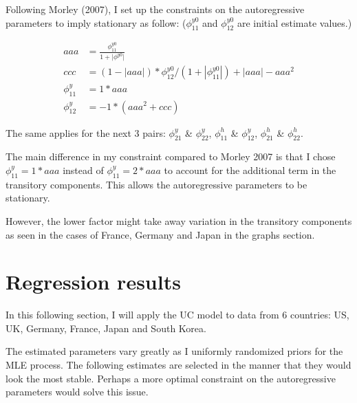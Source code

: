 \documentclass[fleqn]{article}
\begin{document}
\begin{outline}[enumerate]
\pagebreak

Following Morley (2007), I set up the constraints on the autoregressive parameters to imply stationary as follow: ($\phi^{y0}_{11}$ and $\phi^{y0}_{12}$ are initial estimate values.)

\begin{align*}
aaa &= \frac{\phi^{y0}_{11}}{1+|{\phi^{y0}|}}
\\
ccc &=(1 - |aaa|)*\phi^{y0}_{12}/(1 + |\phi^{y0}_{11}|) + |aaa| - aaa^2
\\
\phi^{y}_{11} &= 1*aaa
\\
\phi^{y}_{12} &= -1* (aaa^2 + ccc)
\end{align*}

The same applies for the next 3 pairs: $\phi^{y}_{21}$ \& $\phi^{y}_{22}$, $\phi^{h}_{11}$ \& $\phi^{y}_{12}$, $\phi^{h}_{21}$ \& $\phi^{h}_{22}$.
\vspace{5mm} %

The main difference in my constraint compared to Morley 2007 is that I chose $\phi^{y}_{11} = 1*aaa$ instead of  $\phi^{y}_{11} = 2*aaa$ to account for the additional term in the transitory components. This allows the autoregressive parameters to be stationary. 

However, the lower factor might take away variation in the transitory components as seen in the cases of France, Germany and Japan in the graphs section.

\section{Regression results}

In this following section, I will apply the UC model to data from 6 countries: US, UK, Germany, France, Japan and South Korea.

The estimated parameters vary greatly as I uniformly randomized priors for the MLE process. The following estimates are selected in the manner that they would look the most stable. Perhaps a more optimal constraint on the autoregressive parameters would solve this issue.

\pagebreak



\end{outline}
\end{document}
